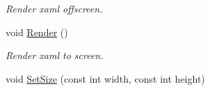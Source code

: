 \begin{DoxyCompactItemize}
\begin{DoxyCompactList}\small\item\em Render xaml offscreen. \end{DoxyCompactList}\item 
\hypertarget{class_u_i_renderer_a6961b53c2f5bf48d18c5164aaf5785d6}{void \hyperlink{class_u_i_renderer_a6961b53c2f5bf48d18c5164aaf5785d6}{Render} ()}\label{class_u_i_renderer_a6961b53c2f5bf48d18c5164aaf5785d6}

\begin{DoxyCompactList}\small\item\em Render xaml to screen. \end{DoxyCompactList}\item 
\hypertarget{class_u_i_renderer_a9afd9d07f2c93d426f55ce2e84a64cef}{void \hyperlink{class_u_i_renderer_a9afd9d07f2c93d426f55ce2e84a64cef}{Set\-Size} (const int width, const int height)}\label{class_u_i_renderer_a9afd9d07f2c93d426f55ce2e84a64cef}


\end{DoxyCompactItemize}
